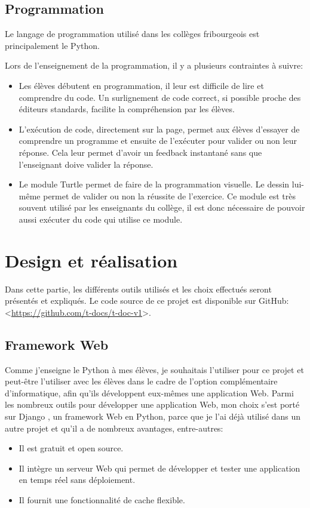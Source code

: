 \documentclass[12pt,titlepage,oneside]{article}
\renewcommand{\cite}[1]{}
\begin{document}
\subsection{Programmation}
Le langage de programmation utilisé dans les collèges fribourgeois est principalement le Python.\par
Lors de l'enseignement de la programmation, il y a plusieurs contraintes à suivre:
\begin{itemize}
\item Les élèves débutent en programmation, il leur est difficile de lire et comprendre du code. Un surlignement de code correct, si possible proche des éditeurs standards, facilite la compréhension par les élèves.
\item L'exécution de code, directement sur la page, permet aux élèves d'essayer de comprendre un programme et ensuite de l'exécuter pour valider ou non leur réponse. Cela leur permet d'avoir un feedback instantané sans que l'enseignant doive valider la réponse.
\item Le module Turtle permet de faire de la programmation visuelle. Le dessin lui-même permet de valider ou non la réussite de l'exercice. Ce module est très souvent utilisé par les enseignants du collège, il est donc nécessaire de pouvoir aussi exécuter du code qui utilise ce module.
\end{itemize}

\newpage

\section{Design et réalisation}
Dans cette partie, les différents outils utilisés et les choix effectués seront présentés et expliqués. Le code source de ce projet est disponible sur GitHub: <\url{https://github.com/t-docs/t-doc-v1}>.\par

\subsection{Framework Web}
Comme j'enseigne le Python à mes élèves, je souhaitais l'utiliser pour ce projet et peut-être l'utiliser avec les élèves dans le cadre de l'option complémentaire d'informatique, afin qu'ils développent eux-mêmes une application Web. Parmi les nombreux outils pour développer une application Web, mon choix s'est porté sur Django \cite{django}, un framework Web en Python, parce que je l'ai déjà utilisé dans un autre projet et qu'il a de nombreux avantages, entre-autres:
\begin{itemize}
\item Il est gratuit et open source.
\item Il intègre un serveur Web qui permet de développer et tester une application en temps réel sans déploiement.
\item Il fournit une fonctionnalité de cache flexible.
\end{itemize}
\end{document}
